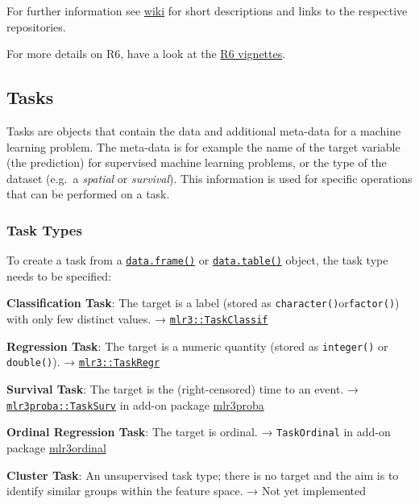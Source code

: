 \documentclass[]{article}
\begin{document}
For further information see \href{https://github.com/mlr-org/mlr3/wiki/Extension-Packages}{wiki} for short descriptions and links to the respective repositories.

For more details on R6, have a look at the \href{https://r6.r-lib.org/}{R6 vignettes}.

\hypertarget{tasks}{%
\subsection{Tasks}\label{tasks}}

Tasks are objects that contain the data and additional meta-data for a machine learning problem.
The meta-data is for example the name of the target variable (the prediction) for supervised machine learning problems, or the type of the dataset (e.g.~a \emph{spatial} or \emph{survival}).
This information is used for specific operations that can be performed on a task.

\hypertarget{tasks-types}{%
\subsubsection{Task Types}\label{tasks-types}}

To create a task from a \href{https://www.rdocumentation.org/packages/base/topics/data.frame}{\texttt{data.frame()}} or \href{https://www.rdocumentation.org/packages/data.table/topics/data.table-package}{\texttt{data.table()}} object, the task type needs to be specified:

\textbf{Classification Task}: The target is a label (stored as \texttt{character()}or\texttt{factor()}) with only few distinct values.
→ \href{https://mlr3.mlr-org.com/reference/TaskClassif.html}{\texttt{mlr3::TaskClassif}}

\textbf{Regression Task}: The target is a numeric quantity (stored as \texttt{integer()} or \texttt{double()}).
→ \href{https://mlr3.mlr-org.com/reference/TaskRegr.html}{\texttt{mlr3::TaskRegr}}

\textbf{Survival Task}: The target is the (right-censored) time to an event.
→ \href{https://mlr3proba.mlr-org.com/reference/TaskSurv.html}{\texttt{mlr3proba::TaskSurv}} in add-on package \href{https://mlr3proba.mlr-org.com}{mlr3proba}

\textbf{Ordinal Regression Task}: The target is ordinal.
→ \texttt{TaskOrdinal} in add-on package \href{https://github.com/mlr-org/mlr3ordinal}{mlr3ordinal}

\textbf{Cluster Task}: An unsupervised task type; there is no target and the aim is to identify similar groups within the feature space.
→ Not yet implemented
\end{document}
